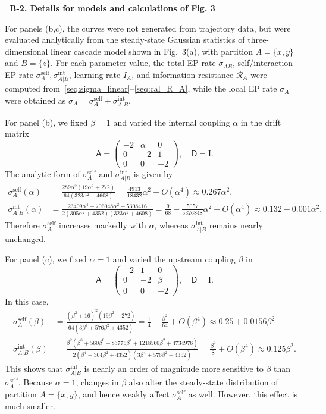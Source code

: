 \documentclass[
 longbibliography,
 twocolumn,
 superscriptaddress,
 amsmath,
 amssymb,
 amsthm,
 amsfonts,
 prl,
 floatfix,
]{revtex4-2}
\newcommand{\matbf}[1]{\boldsymbol{\mathsf{#1}}}
\begin{document}
\begin{widetext}
\bigskip
\noindent\textbf{\textbullet\ B-2. Details for models and calculations of Fig. 3}

For panels (b,c), the curves were not generated from trajectory data, but were evaluated analytically from the steady-state Gaussian statistics of three-dimensional linear cascade model shown in Fig.~3(a), with partition $A=\{x,y\}$ and $B=\{z\}$. For each parameter value, the total EP rate $\sigma_{AB}$, self/interaction EP rate $\sigma_A^{\mathrm{self}},\sigma_{A|B}^{\mathrm{int}}$, learning rate $\dot I_A$, and information resistance $\mathcal R_A$ were computed from~\eqref{seq:sigma_linear}--\eqref{seq:cal_R_A}, while the local EP rate $\sigma_A$ were obtained as $\sigma_A=\sigma_A^{\mathrm{self}}+\sigma_{A|B}^{\mathrm{int}}$.

For panel (b), we fixed $\beta=1$ and varied the internal coupling $\alpha$ in the drift matrix
\[
\matbf A=
\begin{pmatrix}
    -2 & \alpha & 0 \\
    0 & -2 & 1 \\
    0 & 0 & -2
\end{pmatrix},
\quad
\matbf D=\mathrm I.
\]
The analytic form of $\sigma_A^{\mathrm{self}}$ and $\sigma_{A|B}^{\mathrm{int}}$ is given by
\begin{align*}
    \sigma_A^{\mathrm{self}}(\alpha)
    &=\frac{289\alpha^2(19\alpha^2+272)}{64(323\alpha^2+4608)}
    =\frac{4913}{18432}\alpha^2+O(\alpha^4)
    \approx0.267\alpha^2,
    \\
    \sigma_{A|B}^{\mathrm{int}}(\alpha)
    &=\frac{23409\alpha^4+706048\alpha^2+5308416}{2(305\alpha^2+4352)(323\alpha^2+4608)}
    =\frac{9}{68}-\frac{5057}{5326848}\alpha^2+O(\alpha^4)
    \approx
    0.132-0.001\alpha^2.
\end{align*}
Therefore $\sigma_A^{\mathrm{self}}$ increases markedly with $\alpha$, whereas $\sigma_{A|B}^{\mathrm{int}}$ remains nearly unchanged.

For panel (c), we fixed $\alpha=1$ and varied the upstream coupling $\beta$ in
\[
\matbf A=
\begin{pmatrix}
    -2 & 1 & 0 \\
    0 & -2 & \beta \\
    0 & 0 & -2
\end{pmatrix},
\quad
\matbf D=\mathrm I.
\]
In this case,
\begin{align*}
    \sigma_A^{\mathrm{self}}(\beta)
    &=\frac{(\beta^2+16)^2(19\beta^2+272)}{64(3\beta^4+576\beta^2+4352)}
    =\frac{1}{4}+\frac{\beta^2}{64}+O(\beta^4)
    \approx
    0.25+0.0156\beta^2
    \\
    \sigma_{A|B}^{\mathrm{int}}(\beta)
    &=\frac{\beta^2(\beta^8+560\beta^6+83776\beta^4+1218560\beta^2+4734976)}{2(\beta^4+304\beta^2+4352)(3\beta^4+576\beta^2+4352)}
    =\frac{\beta^2}{8}+O(\beta^4)
    \approx0.125\beta^2.
\end{align*}
This shows that $\sigma_{A|B}^{\mathrm{int}}$ is nearly an order of magnitude more sensitive to $\beta$ than $\sigma_{A}^{\mathrm{self}}$.
Because $\alpha=1$, changes in $\beta$ also alter the steady-state distribution of partition $A=\{x,y\}$, and hence weakly affect $\sigma_A^{\mathrm{self}}$ as well. However, this effect is much smaller.


\end{widetext}
\end{document}
